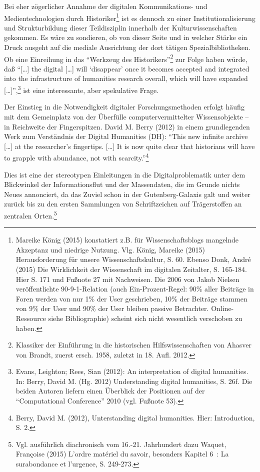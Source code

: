 \documentclass[a4paper,
fontsize=11pt,
oneside,
numbers=noperiodatend,
parskip=half-,
bibliography=totoc,
final
]{scrartcl}
\begin{document}
Bei eher zögerlicher Annahme der digitalen Kommunikations- und
Medientechnologien durch Historiker\footnote{Mareike König (2015)
  konstatiert z.B. für Wissenschaftsblogs mangelnde Akzeptanz und
  niedrige Nutzung. Vlg. König, Mareike (2015) Herausforderung für
  unsere Wissenschaftskultur, S. 60. Ebenso Donk, André (2015) Die
  Wirklichkeit der Wissenschaft im digitalen Zeitalter, S. 165-184. Hier
  S. 171 und Fußnote 27 mit Nachweisen. Die 2006 von Jakob Nielsen
  veröffentlichte 90-9-1-Relation (auch Ein-Prozent-Regel: 90\% aller
  Beiträge in Foren werden von nur 1\% der User geschrieben, 10\% der
  Beiträge stammen von 9\% der User und 90\% der User bleiben passive
  Betrachter. Online-Ressource siehe Bibliographie) scheint sich nicht
  wesentlich verschoben zu haben.} ist es dennoch zu einer
Institutionalisierung und Strukturbildung dieser Teildisziplin innerhalb
der Kulturwissenschaften gekommen. Es wäre zu sondieren, ob von dieser
Seite und in welcher Stärke ein Druck ausgeht auf die mediale
Ausrichtung der dort tätigen Spezialbibliotheken. Ob eine Einreihung in
das \enquote{Werkzeug des Historikers}\footnote{Klassiker der Einführung
  in die historischen Hilfswissenschaften von Ahasver von Brandt, zuerst
  ersch. 1958, zuletzt in 18. Aufl. 2012.} zur Folge haben würde, daß
\enquote{{[}\ldots{}{]} the digital {[}\ldots{}{]} will
\enquote{disappear} once it becomes accepted and integrated into the
infrastructure of humanities research overall, which will have expanded
{[}\ldots{}{]}},\footnote{Evans, Leighton; Rees, Sian (2012): An
  interpretation of digital humanities. In: Berry, David M. (Hg. 2012)
  Understanding digital humanities, S. 26f. Die beiden Autoren liefern
  einen Überblick der Positionen auf der \enquote{Computational
  Conference} 2010 (vgl. Fußnote 53).} ist eine interessante, aber
spekulative Frage.

Der Einstieg in die Notwendigkeit digitaler Forschungsmethoden erfolgt
häufig mit dem Gemeinplatz von der Überfülle computervermittelter
Wissensobjekte -- in Reichweite der Fingerspitzen. David M. Berry (2012)
in einem grundlegenden Werk zum Verständnis der Digital Humanities (DH):
\enquote{This new infinite archive {[}\ldots{}{]} at the researcher's
fingertips. {[}\ldots{}{]} It is now quite clear that historians will
have to grapple with abundance, not with scarcity.}\footnote{Berry,
  David M. (2012), Unterstanding digital humanities. Hier: Introduction,
  S. 2.}

Dies ist eine der stereotypen Einleitungen in die Digitalproblematik
unter dem Blickwinkel der Informationsflut und der Massendaten, die im
Grunde nichts Neues annonciert, da das Zuviel schon in der
Gutenberg-Galaxis galt und weiter zurück bis zu den ersten Sammlungen
von Schriftzeichen auf Trägerstoffen an zentralen Orten.\footnote{Vgl.
  ausführlich diachronisch vom 16.-21. Jahrhundert dazu Waquet,
  Françoise (2015) L'ordre matériel du savoir, besonders Kapitel 6~: La
  surabondance et l'urgence, S. 249-273.}
\end{document}
